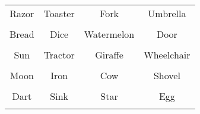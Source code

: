 \documentclass[12pt,a4paper]{article}
\begin{document}
\thispagestyle{empty}
\begin{table}[]
\centering
\Huge
\begin{tabular}{cccc}
 Razor& Toaster& Fork& Umbrella\\  & & & \\
 Bread& Dice& Watermelon& Door\\  & & & \\
 Sun& Tractor& Giraffe& Wheelchair\\  & & & \\
 Moon& Iron& Cow& Shovel\\  & & & \\
 Dart& Sink& Star& Egg\\  & & & \\
\end{tabular}
\end{table}
\end{document}
